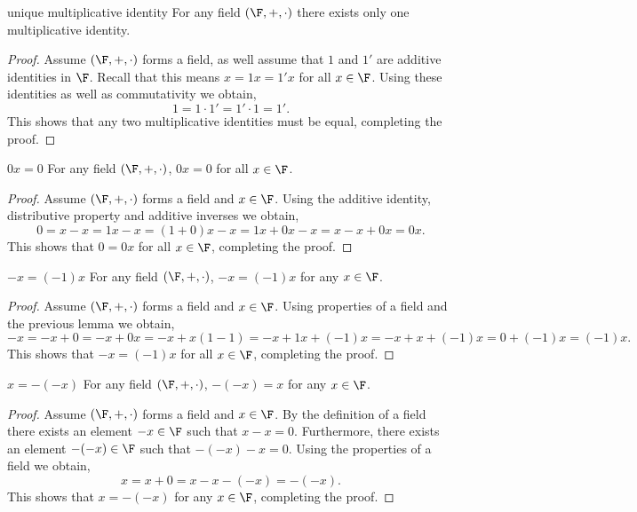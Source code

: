 \documentclass{report}
\begin{document}
\begin{lemma}{unique multiplicative identity}{}
  For any field $\left(\F, +, \cdot\right)$ there exists only one multiplicative identity.
\end{lemma}

\begin{proof}
  Assume $\left(\F, +, \cdot\right)$ forms a field, as well assume that $1$ and $1'$ are additive identities in $\F$.
  Recall that this means $x = 1x =  1'x$ for all $x \in \F$.
  Using these identities as well as commutativity we obtain,
  $$1 = 1 \cdot 1' = 1' \cdot 1 = 1'.$$
  This shows that any two multiplicative identities must be equal, completing the proof.
\end{proof}

\begin{lemma}{$0x = 0$}{}
  For any field $\left(\F, +, \cdot\right)$, $0x = 0$ for all $x \in \F$.
\end{lemma}

\begin{proof}
  Assume $\left(\F, +, \cdot\right)$ forms a field and $x \in \F$.
  Using the additive identity, distributive property and additive inverses we obtain,
  $$0 = x - x = 1x - x = (1 + 0)x - x = 1x + 0x - x = x - x + 0x = 0x.$$
  This shows that $0 = 0x$ for all $x \in \F$, completing the proof.
\end{proof}

\begin{lemma}{$-x = (-1)x$}{}
  For any field $\left(\F, +, \cdot\right)$, $-x = (-1)x$ for any $x \in \F$.
\end{lemma}

\begin{proof}
  Assume $\left(\F, +, \cdot\right)$ forms a field and $x \in \F$.
  Using properties of a field and the previous lemma we obtain,
  $$-x = -x + 0 = -x + 0x = -x + x(1 - 1) = -x + 1x + (-1)x = -x + x + (-1)x = 0 + (-1)x = (-1)x.$$
  This shows that $-x = (-1)x$ for all $x \in \F$, completing the proof.
\end{proof}

\begin{lemma}{$x = -(-x)$}{}
  For any field $\left(\F, +, \cdot\right)$, $-(-x) = x$ for any $x \in \F$.
\end{lemma}

\begin{proof}
  Assume $\left(\F, +, \cdot\right)$ forms a field and $x \in \F$.
  By the definition of a field there exists an element $-x \in \F$ such that $x - x = 0$.
  Furthermore, there exists an element $-(-x) \in \F$ such that $-(-x) - x = 0$.
  Using the properties of a field we obtain,
  $$x = x + 0 = x - x -(-x) = -(-x).$$
  This shows that $x = -(-x)$ for any $x \in \F$, completing the proof.
\end{proof}
\end{document}
